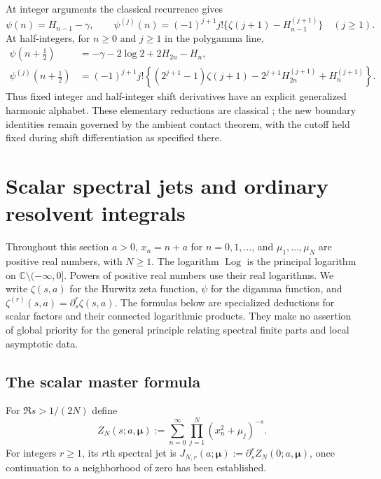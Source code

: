 \documentclass[11pt,letterpaper]{article}
\numberwithin{equation}{section}
\theoremstyle{definition}
\theoremstyle{remark}
\DeclareMathOperator{\Log}{Log}
\begin{document}
At integer arguments the classical recurrence gives
\[
 \psi(n)=H_{n-1}-\gamma,\qquad
 \psi^{(j)}(n)=(-1)^{j+1}j!
       \{\zeta(j+1)-H_{n-1}^{(j+1)}\}\quad(j\ge1).
\]
At half-integers, for \(n\ge0\) and \(j\ge1\) in the polygamma line,
\begin{align*}
 \psi(n+\tfrac12)&=-\gamma-2\log2+2H_{2n}-H_n,\\
 \psi^{(j)}(n+\tfrac12)
 &=(-1)^{j+1}j!\left\{
    (2^{j+1}-1)\zeta(j+1)-2^{j+1}H_{2n}^{(j+1)}
                               +H_n^{(j+1)}\right\}.
\end{align*}
Thus fixed integer and half-integer shift derivatives have an explicit
generalized harmonic alphabet. These elementary reductions are
classical \cite{DLMF}; the new boundary identities remain governed by the
ambient contact theorem, with the cutoff held fixed during shift
differentiation as specified there.



\section{Scalar spectral jets and ordinary resolvent integrals}
\label{sp:section}

Throughout this section $a>0$, $x_n=n+a$ for $n=0,1,\ldots$, and
$\mu_1,\ldots,\mu_N$ are positive real numbers, with $N\geq1$.
The logarithm $\Log$ is the principal logarithm on
$\mathbb C\setminus(-\infty,0]$.  Powers of positive real numbers use
their real logarithms.  We write $\zeta(s,a)$ for the Hurwitz zeta
function, $\psi$ for the digamma function, and
$\zeta^{(r)}(s,a)=\partial_s^r\zeta(s,a)$.
The formulas below are specialized deductions for scalar factors and
their connected logarithmic products.  They make no assertion of
global priority for the general principle relating spectral finite
parts and local asymptotic data.

\subsection{The scalar master formula}
\label{sp:scalar-subsection}

For $\Re s>1/(2N)$ define
\begin{equation}
 Z_N(s;a,\boldsymbol\mu)
 :=\sum_{n=0}^{\infty}\prod_{j=1}^{N}(x_n^2+\mu_j)^{-s}.
 \label{sp:zeta-definition}
\end{equation}
For integers $r\geq1$, its $r$th spectral jet is
$J_{N,r}(a;\boldsymbol\mu):=\partial_s^rZ_N(0;a,\boldsymbol\mu)$,
once continuation to a neighborhood of zero has been established.
\end{document}
